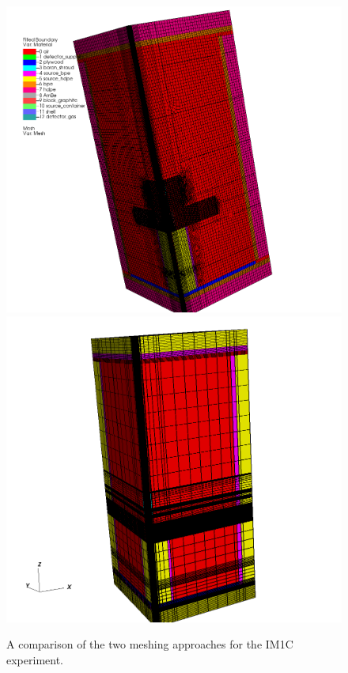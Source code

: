\documentclass[11pt, letterpaper,titlepage,oneside]{article}
\begin{document}
\begin{figure}[H]
\centering
\includegraphics[scale=0.17]{../figures/im1_228.png}
\includegraphics[scale=0.17]{../figures/im1c_prism.png}
\caption{A comparison of the two meshing approaches for the IM1C experiment.}
\label{comparison}
\end{figure}
\end{document}
